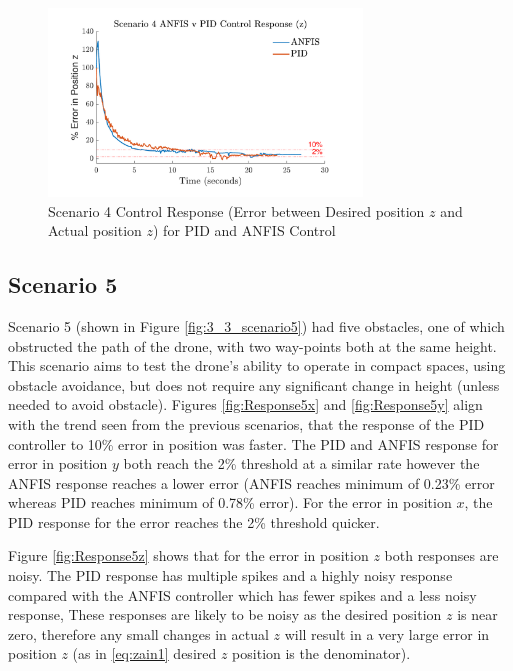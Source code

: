 \begin{figure}[H]
    \centering
    \begin{minipage}[b]{0.45\textwidth}
    \end{minipage}
    \hfill
    \begin{minipage}[b]{0.45\textwidth}
        \centering
        \includegraphics[height=5cm,keepaspectratio]{img/Scenario 4 Error in z Position.pdf}
        \caption{Scenario 4 Control Response (Error between Desired position $z$ and Actual position $z$) for PID and ANFIS Control}
        \label{fig:Response4z}
    \end{minipage}
    \hfill
    \begin{minipage}[b]{0.45\textwidth}
    \end{minipage}
\end{figure}

\subsection{Scenario 5}
Scenario 5 (shown in Figure \ref{fig:3_3_scenario5}) had five obstacles, one of which obstructed the path of the drone, with two way-points both at the same height. This scenario aims to test the drone's ability to operate in compact spaces, using obstacle avoidance, but does not require any significant change in height (unless needed to avoid obstacle). Figures \ref{fig:Response5x} and \ref{fig:Response5y} align with the trend seen from the previous scenarios, that the response of the PID controller to 10\% error in position was faster. The PID and ANFIS response for error in position $y$ both reach the 2\% threshold at a similar rate however the ANFIS response reaches a lower error (ANFIS reaches minimum of 0.23\% error whereas PID reaches minimum of 0.78\% error). For the error in position $x$, the PID response for the error reaches the 2\% threshold quicker. 

Figure \ref{fig:Response5z} shows that for the error in position $z$ both responses are noisy. The PID response has multiple spikes and a highly noisy response compared with the ANFIS controller which has fewer spikes and a less noisy response, These responses are likely to be noisy as the desired position $z$ is near zero, therefore any small changes in actual $z$ will result in a very large error in position $z$ (as in \eqref{eq:zain1} desired $z$ position is the denominator). 

